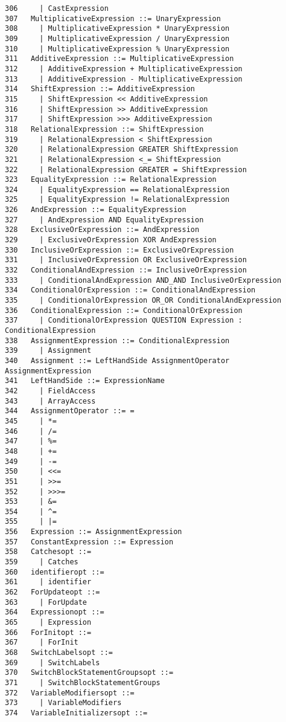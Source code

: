 {\begin{verbatim}
306     | CastExpression
307   MultiplicativeExpression ::= UnaryExpression
308     | MultiplicativeExpression * UnaryExpression
309     | MultiplicativeExpression / UnaryExpression
310     | MultiplicativeExpression % UnaryExpression
311   AdditiveExpression ::= MultiplicativeExpression
312     | AdditiveExpression + MultiplicativeExpression
313     | AdditiveExpression - MultiplicativeExpression
314   ShiftExpression ::= AdditiveExpression
315     | ShiftExpression << AdditiveExpression
316     | ShiftExpression >> AdditiveExpression
317     | ShiftExpression >>> AdditiveExpression
318   RelationalExpression ::= ShiftExpression
319     | RelationalExpression < ShiftExpression
320     | RelationalExpression GREATER ShiftExpression
321     | RelationalExpression <_= ShiftExpression
322     | RelationalExpression GREATER = ShiftExpression
323   EqualityExpression ::= RelationalExpression
324     | EqualityExpression == RelationalExpression
325     | EqualityExpression != RelationalExpression
326   AndExpression ::= EqualityExpression
327     | AndExpression AND EqualityExpression
328   ExclusiveOrExpression ::= AndExpression
329     | ExclusiveOrExpression XOR AndExpression
330   InclusiveOrExpression ::= ExclusiveOrExpression
331     | InclusiveOrExpression OR ExclusiveOrExpression
332   ConditionalAndExpression ::= InclusiveOrExpression
333     | ConditionalAndExpression AND_AND InclusiveOrExpression
334   ConditionalOrExpression ::= ConditionalAndExpression
335     | ConditionalOrExpression OR_OR ConditionalAndExpression
336   ConditionalExpression ::= ConditionalOrExpression
337     | ConditionalOrExpression QUESTION Expression : ConditionalExpression
338   AssignmentExpression ::= ConditionalExpression
339     | Assignment
340   Assignment ::= LeftHandSide AssignmentOperator AssignmentExpression
341   LeftHandSide ::= ExpressionName
342     | FieldAccess
343     | ArrayAccess
344   AssignmentOperator ::= =
345     | *=
346     | /=
347     | %=
348     | +=
349     | -=
350     | <<=
351     | >>=
352     | >>>=
353     | &=
354     | ^=
355     | |=
356   Expression ::= AssignmentExpression
357   ConstantExpression ::= Expression
358   Catchesopt ::=
359     | Catches
360   identifieropt ::=
361     | identifier
362   ForUpdateopt ::=
363     | ForUpdate
364   Expressionopt ::=
365     | Expression
366   ForInitopt ::=
367     | ForInit
368   SwitchLabelsopt ::=
369     | SwitchLabels
370   SwitchBlockStatementGroupsopt ::=
371     | SwitchBlockStatementGroups
372   VariableModifiersopt ::=
373     | VariableModifiers
374   VariableInitializersopt ::=

\end{verbatim}}
